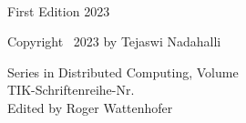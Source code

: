 ~\\
\vfill

\noindent
First Edition 2023\\
\vspace{0.1cm}

\noindent
Copyright \textcopyright~2023 by Tejaswi Nadahalli\\  %
\vspace{0.1cm}

\noindent
Series in Distributed Computing, Volume \DISCOSERIESNUMBER \\
TIK-Schriftenreihe-Nr.\ \TIKSERIESNUMBER \\
Edited by Roger Wattenhofer\\
\vspace{0.1cm}